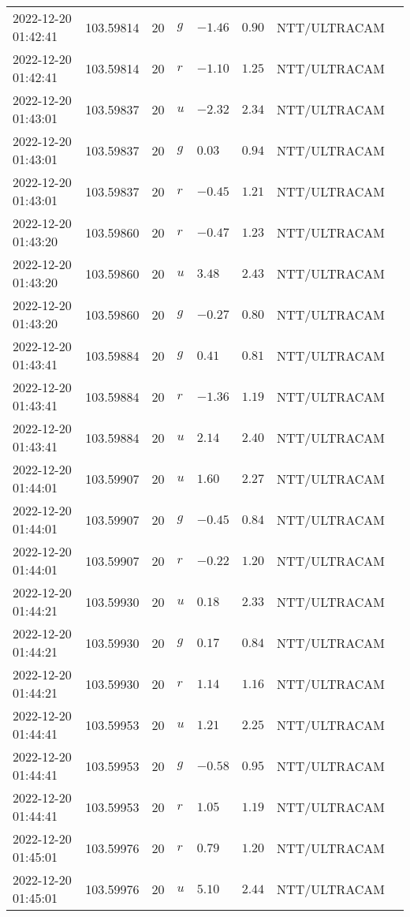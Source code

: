 \documentclass{nature_plusfigure}
\begin{document}
\begin{supplement}
\begin{center}
\begin{longtable}{llllllll}
2022-12-20 01:42:41 & 103.59814 & 20 & $g$ & $-1.46$ & $0.90$ & NTT/ULTRACAM &  \\ 
2022-12-20 01:42:41 & 103.59814 & 20 & $r$ & $-1.10$ & $1.25$ & NTT/ULTRACAM &  \\ 
2022-12-20 01:43:01 & 103.59837 & 20 & $u$ & $-2.32$ & $2.34$ & NTT/ULTRACAM &  \\ 
2022-12-20 01:43:01 & 103.59837 & 20 & $g$ & $0.03$ & $0.94$ & NTT/ULTRACAM &  \\ 
2022-12-20 01:43:01 & 103.59837 & 20 & $r$ & $-0.45$ & $1.21$ & NTT/ULTRACAM &  \\ 
2022-12-20 01:43:20 & 103.59860 & 20 & $r$ & $-0.47$ & $1.23$ & NTT/ULTRACAM &  \\ 
2022-12-20 01:43:20 & 103.59860 & 20 & $u$ & $3.48$ & $2.43$ & NTT/ULTRACAM &  \\ 
2022-12-20 01:43:20 & 103.59860 & 20 & $g$ & $-0.27$ & $0.80$ & NTT/ULTRACAM &  \\ 
2022-12-20 01:43:41 & 103.59884 & 20 & $g$ & $0.41$ & $0.81$ & NTT/ULTRACAM &  \\ 
2022-12-20 01:43:41 & 103.59884 & 20 & $r$ & $-1.36$ & $1.19$ & NTT/ULTRACAM &  \\ 
2022-12-20 01:43:41 & 103.59884 & 20 & $u$ & $2.14$ & $2.40$ & NTT/ULTRACAM &  \\ 
2022-12-20 01:44:01 & 103.59907 & 20 & $u$ & $1.60$ & $2.27$ & NTT/ULTRACAM &  \\ 
2022-12-20 01:44:01 & 103.59907 & 20 & $g$ & $-0.45$ & $0.84$ & NTT/ULTRACAM &  \\ 
2022-12-20 01:44:01 & 103.59907 & 20 & $r$ & $-0.22$ & $1.20$ & NTT/ULTRACAM &  \\ 
2022-12-20 01:44:21 & 103.59930 & 20 & $u$ & $0.18$ & $2.33$ & NTT/ULTRACAM &  \\ 
2022-12-20 01:44:21 & 103.59930 & 20 & $g$ & $0.17$ & $0.84$ & NTT/ULTRACAM &  \\ 
2022-12-20 01:44:21 & 103.59930 & 20 & $r$ & $1.14$ & $1.16$ & NTT/ULTRACAM &  \\ 
2022-12-20 01:44:41 & 103.59953 & 20 & $u$ & $1.21$ & $2.25$ & NTT/ULTRACAM &  \\ 
2022-12-20 01:44:41 & 103.59953 & 20 & $g$ & $-0.58$ & $0.95$ & NTT/ULTRACAM &  \\ 
2022-12-20 01:44:41 & 103.59953 & 20 & $r$ & $1.05$ & $1.19$ & NTT/ULTRACAM &  \\ 
2022-12-20 01:45:01 & 103.59976 & 20 & $r$ & $0.79$ & $1.20$ & NTT/ULTRACAM &  \\ 
2022-12-20 01:45:01 & 103.59976 & 20 & $u$ & $5.10$ & $2.44$ & NTT/ULTRACAM &  \\ 

\end{longtable}
\end{center}
\end{supplement}
\end{document}
